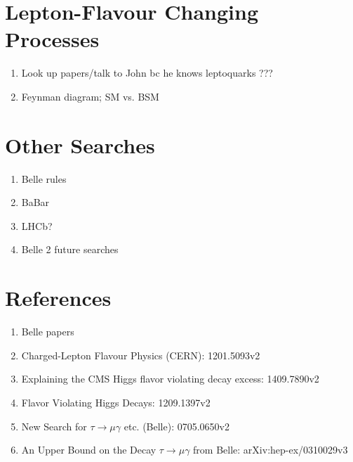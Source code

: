 \documentclass[a4paper]{article} %
\begin{document}
\section{Lepton-Flavour Changing Processes}
\begin{enumerate}
\item Look up papers/talk to John bc he knows leptoquarks ???
\item Feynman diagram; SM vs. BSM
\end{enumerate}

\section{Other Searches}
\begin{enumerate}
\item Belle rules
\item BaBar
\item LHCb?
\item Belle 2 future searches
\end{enumerate}

\section{References}
\begin{enumerate}
\item Belle papers
\item Charged-Lepton Flavour Physics (CERN): 1201.5093v2
\item Explaining the CMS Higgs flavor violating decay excess: 1409.7890v2
\item Flavor Violating Higgs Decays: 1209.1397v2
\item New Search for $\tau\to\mu\gamma$ etc. (Belle): 0705.0650v2
\item An Upper Bound on the Decay $\tau\to\mu\gamma$ from Belle: arXiv:hep-ex/0310029v3
\end{enumerate}





\pagebreak



\end{document}
